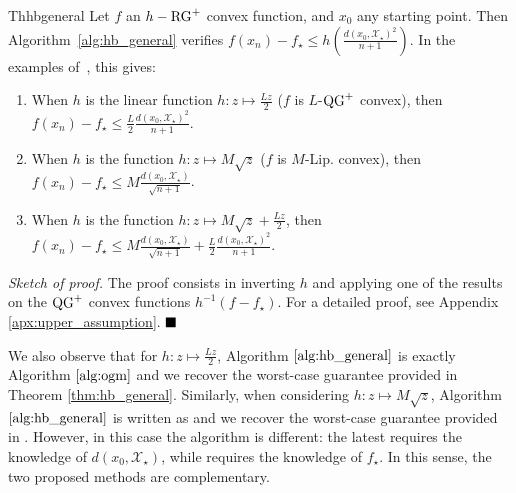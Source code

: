     \begin{center}
    \begin{restatable}{Th}{hbgeneral}\textbf{\emph{    \label{thm:hb_general}}}
    Let $f$ an $h-\operatorname{RG}^+$ convex function, and $x_0$ any starting point.
    Then Algorithm~\ref{alg:hb_general} verifies
        $f(x_n) - f_\star \leq h\left(\frac{d(x_0, \mathcal{X}_\star)^2}{n+1} \right).$
    In the examples of~, this gives:
        \begin{enumerate}[noitemsep, topsep=1pt,leftmargin=*]
            \item When $h$ is the linear function $h: z \mapsto \frac{Lz}{2}$ ($f$ is $L$-$\operatorname{QG}^+$ convex), then $f(x_n) - f_\star \leq \frac{L}{2}\frac{d(x_0, \mathcal{X}_\star)^2}{n+1}$.
            \item When $h$ is the function $h: z \mapsto M\sqrt{z}$ ($f$ is $M$-Lip. convex), then $f(x_n) - f_\star \leq M\frac{d(x_0, \mathcal{X}_\star)}{\sqrt{n+1}}$.
            \item When $h$ is the function $h: z \mapsto M\sqrt{z} + \frac{Lz}{2}$, then $f(x_n) - f_\star \leq M\frac{d(x_0, \mathcal{X}_\star)}{\sqrt{n+1}} + \frac{L}{2}\frac{d(x_0, \mathcal{X}_\star)^2}{n+1}$.
        \end{enumerate}
    \end{restatable}
    \end{center}
    
    \noindent \textit{Sketch of proof.}
    The proof consists in inverting $h$ and applying one of the results on the $\operatorname{QG}^+$ convex functions $h^{-1}\left( f - f_\star \right)$.
    For a detailed proof, see Appendix \ref{apx:upper_assumption}.
    $\hfill\blacksquare$
    
    
    
    
    We also observe that for $h: z \mapsto \frac{Lz}{2}$, Algorithm $\ref{alg:hb_general}$ is exactly Algorithm $\ref{alg:ogm}$ and we recover the worst-case guarantee provided in Theorem \ref{thm:hb_general}. 
    Similarly, when considering $h: z \mapsto M\sqrt{z}$, Algorithm $\ref{alg:hb_general}$ is written as  and we recover the worst-case guarantee provided in \citep[Cor. 3]{drori2020efficient}. However, in this case the algorithm is different: the latest requires the knowledge of $d(x_0, \mathcal{X}_\star)$, while   requires the knowledge of $f_\star$. In this sense, the two proposed methods are complementary.
    
